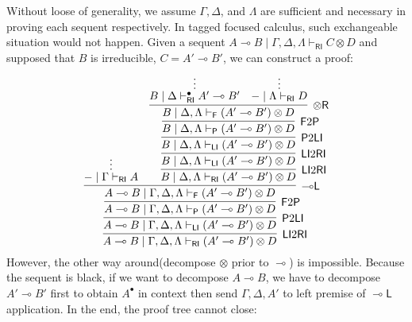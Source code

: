 \documentclass[submission,copyright,creativecommons]{eptcs}
\theoremstyle{definition}
\newcommand{\tr}{\otimes \mathsf{R}}
\newcommand{\lleft}{{\multimap}\mathsf{L}}
\newcommand{\ot}{\otimes}
\newcommand{\lolli}{\multimap}
\newcommand{\RI}{\mathsf{RI}}
\newcommand{\LI}{\mathsf{LI}}
\newcommand{\Pass}{\mathsf{P}}
\newcommand{\F}{\mathsf{F}}
\begin{document}
Without loose of generality, we assume $\Gamma, \Delta$, and $\Lambda$ are sufficient and necessary in proving each sequent respectively.
In tagged focused calculus, such exchangeable situation would not happen.
Given a sequent $A \lolli B \mid \Gamma , \Delta , \Lambda \vdash_{\RI} C \ot D$ and supposed that $B$ is irreducible, $C = A' \lolli B'$,
we can construct a proof:
\begin{displaymath}
  \infer[\LI 2 \RI]{A \lolli B \mid \Gamma , \Delta , \Lambda \vdash_{\RI} (A' \lolli B') \ot D}{
    \infer[\Pass 2 \LI]{A \lolli B \mid \Gamma , \Delta , \Lambda \vdash_{\LI} (A' \lolli B') \ot D}{
      \infer[\F 2 \Pass]{A \lolli B \mid \Gamma , \Delta , \Lambda \vdash_{\Pass} (A' \lolli B') \ot D}{
        \infer[\lleft]{A \lolli B \mid \Gamma , \Delta , \Lambda \vdash_{\F} (A' \lolli B') \ot D}{
          \deduce{- \mid \Gamma \vdash_{\RI} A }{\vdots}
          &
          \infer[\LI 2 \RI]{B \mid \Delta , \Lambda \vdash_{\RI} (A' \lolli B') \ot D}{
            \infer[\LI 2 \RI]{B \mid \Delta , \Lambda \vdash_{\LI} (A' \lolli B') \ot D}{
              \infer[\Pass 2 \LI]{B \mid \Delta , \Lambda \vdash_{\LI} (A' \lolli B') \ot D}{
                \infer[\F 2 \Pass]{B \mid \Delta , \Lambda \vdash_{\Pass} (A' \lolli B') \ot D}{
                  \infer[\tr]{B \mid \Delta , \Lambda \vdash_{\F} (A' \lolli B') \ot D}{
                    \deduce{B \mid \Delta \vdash^{\bullet}_{\RI} A' \lolli B'}{\vdots}
                    &
                    \deduce{- \mid \Lambda \vdash_{\RI} D}{\vdots}
                  }
                }
              }
            }
          }
        }
      }
    }
  }
\end{displaymath}
However, the other way around(decompose $\ot$ prior to $\lolli$) is impossible.
Because the sequent is black, if we want to decompose $A \lolli B$, we have to decompose $A' \lolli B'$ first to obtain $A^{\bullet}$ in context then send $\Gamma , \Delta , A'$ to left premise of $\lleft$ application.
In the end, the proof tree cannot close:
\end{document}
